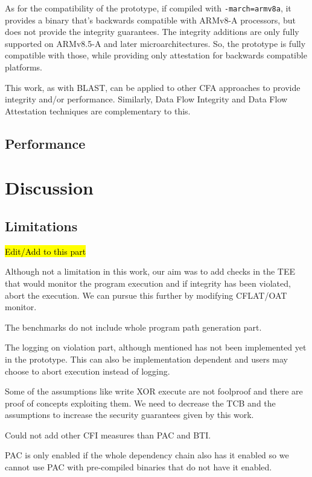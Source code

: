 \documentclass[a4paper, nobind]{templates/ociamthesis}
\begin{document}
As for the compatibility of the prototype, if compiled with \texttt{-march=armv8a}, it
provides a binary that's backwards compatible with ARMv8-A processors,
but does not provide the integrity guarantees.
The integrity additions are only fully supported on ARMv8.5-A and later microarchitectures.
So, the prototype is fully compatible with those, while providing only attestation for
backwards compatible platforms.

This work, as with BLAST, can be applied to other CFA approaches to provide
integrity and/or performance. Similarly, Data Flow Integrity and Data Flow Attestation
techniques are complementary to this.

\section{Performance}\label{performance}

\chapter{Discussion}\label{discussion}

\minitoc 

\section{Limitations}\label{limitations-2}

\hl{Edit/Add to this part}

Although not a limitation in this work, our aim was to add checks in the TEE
that would monitor the program execution and if integrity has been violated,
abort the execution. We can pursue this further by modifying CFLAT/OAT monitor.

The benchmarks do not include whole program path generation part.

The logging on violation part, although mentioned has not been implemented yet
in the prototype. This can also be implementation dependent and users may choose
to abort execution instead of logging.

Some of the assumptions like write XOR execute are not foolproof and there are
proof of concepts exploiting them. We need to decrease the TCB and the
assumptions to increase the security guarantees given by this work.

Could not add other CFI measures than PAC and BTI.

PAC is only enabled if the whole dependency chain also has it enabled so we
cannot use PAC with pre-compiled binaries that do not have it enabled.
\end{document}
